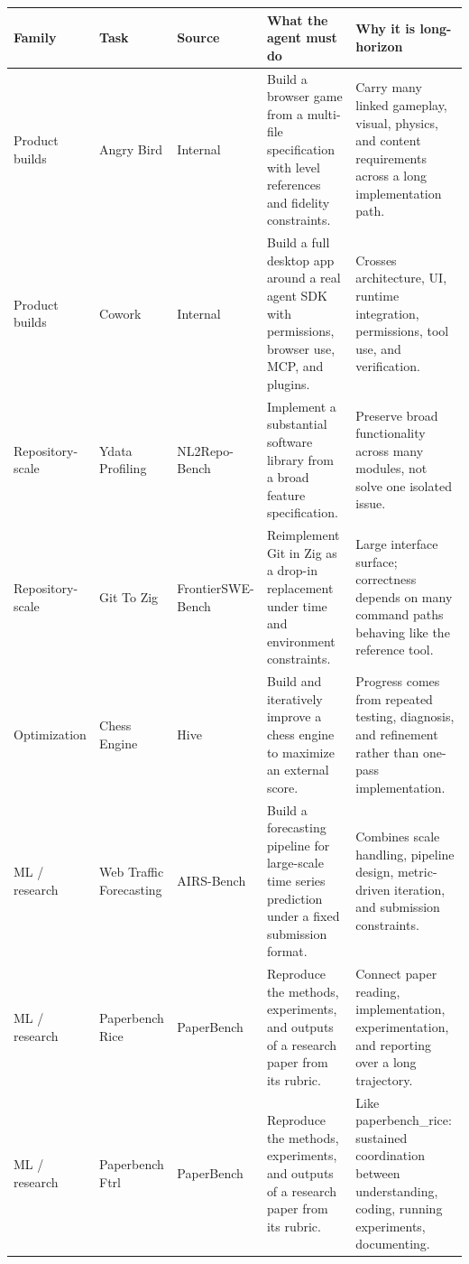 \documentclass[11pt,a4paper]{article}
\renewcommand{\arraystretch}{1.18}
\newcommand{\code}[1]{#1}
\begin{document}
\begingroup
\renewcommand{\arraystretch}{1.25}
\setlength{\tabcolsep}{4pt}
\footnotesize
\noindent\begin{longtable}{@{}>{\raggedright\arraybackslash}p{2.0cm}>{\raggedright\arraybackslash}p{2.2cm}>{\raggedright\arraybackslash}p{1.8cm}>{\raggedright\arraybackslash}p{4.4cm}>{\raggedright\arraybackslash}p{4.4cm}@{}}
\toprule
\rowcolor{tablehead}\textbf{\color{white}Family} & \textbf{\color{white}Task} & \textbf{\color{white}Source} & \textbf{\color{white}What the agent must do} & \textbf{\color{white}Why it is long-horizon} \\
\midrule
\endhead
Product builds & \code{Angry Bird} & Internal & Build a browser game from a multi-file specification with level references and fidelity constraints. & Carry many linked gameplay, visual, physics, and content requirements across a long implementation path. \\
\rowcolor{tableband}
Product builds & \code{Cowork} & Internal & Build a full desktop app around a real agent SDK with permissions, browser use, MCP, and plugins. & Crosses architecture, UI, runtime integration, permissions, tool use, and verification. \\
Repository-scale & \code{Ydata Profiling} & NL2Repo-Bench & Implement a substantial software library from a broad feature specification. & Preserve broad functionality across many modules, not solve one isolated issue. \\
\rowcolor{tableband}
Repository-scale & \code{Git To Zig} & FrontierSWE-Bench & Reimplement Git in Zig as a drop-in replacement under time and environment constraints. & Large interface surface; correctness depends on many command paths behaving like the reference tool. \\
Optimization & \code{Chess Engine} & Hive & Build and iteratively improve a chess engine to maximize an external score. & Progress comes from repeated testing, diagnosis, and refinement rather than one-pass implementation. \\
\rowcolor{tableband}
ML / research & \code{Web Traffic Forecasting} & AIRS-Bench & Build a forecasting pipeline for large-scale time series prediction under a fixed submission format. & Combines scale handling, pipeline design, metric-driven iteration, and submission constraints. \\
ML / research & \code{Paperbench Rice} & PaperBench & Reproduce the methods, experiments, and outputs of a research paper from its rubric. & Connect paper reading, implementation, experimentation, and reporting over a long trajectory. \\
\rowcolor{tableband}
ML / research & \code{Paperbench Ftrl} & PaperBench & Reproduce the methods, experiments, and outputs of a research paper from its rubric. & Like \code{paperbench\_rice}: sustained coordination between understanding, coding, running experiments, documenting. \\
\bottomrule
\end{longtable}
\endgroup
\end{document}
